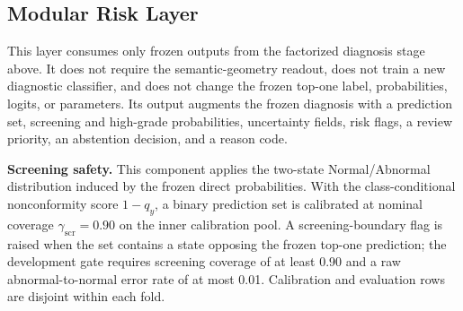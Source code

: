 \documentclass[conference]{IEEEtran}
\begin{document}
\subsection{Modular Risk Layer}
\label{sec:risk}
This layer consumes only frozen outputs from the factorized diagnosis
stage above. It does not require the semantic-geometry readout, does
not train a new diagnostic classifier, and does not change the frozen
top-one label, probabilities, logits, or parameters. Its output
augments the frozen diagnosis with a prediction set, screening and
high-grade probabilities, uncertainty fields, risk flags, a review
priority, an abstention decision, and a reason code.

\textbf{Screening safety.} This component applies the two-state
Normal/Abnormal distribution induced by the frozen direct
probabilities. With the class-conditional nonconformity score
$1-q_y$, a binary prediction set is calibrated at nominal coverage
$\gamma_{\mathrm{scr}}=0.90$ on the inner calibration pool. A
screening-boundary flag is raised when the set contains a state
opposing the frozen top-one prediction; the development gate requires
screening coverage of at least 0.90 and a raw abnormal-to-normal
error rate of at most 0.01. Calibration and evaluation rows are
disjoint within each fold.
\end{document}
